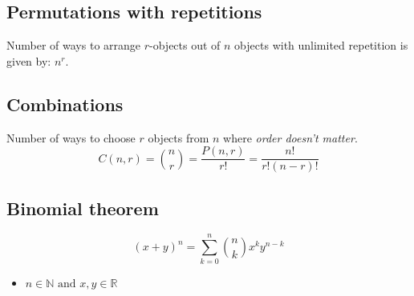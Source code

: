 \subsection{Permutations with repetitions}
    \begin{definition}
        Number of ways to arrange \( r \)-objects out of \( n \) objects with unlimited repetition is given by: $n^r$.
    \end{definition}

\subsection{Combinations}
    \begin{definition}
        Number of ways to choose $r$ objects from $n$ where \emph{order doesn't matter}. 
        \begin{equation}
            C(n,r) = \binom{n}{r} = \frac{P(n,r)}{r!} = \frac{n!}{r!(n-r)!}
        \end{equation}
    \end{definition}

\subsection{Binomial theorem}
    \begin{definition}
        \begin{equation}
            (x+y)^n = \sum_{k=0}^{n} \binom{n}{k} x^k y^{n-k}
        \end{equation}
        \begin{itemize}
            \item $n \in \mathbb{N} \text{ and } x,y\in \mathbb{R}$
        \end{itemize}
    \end{definition}